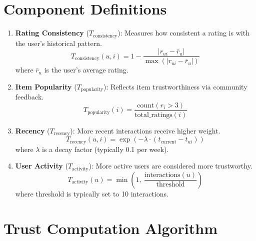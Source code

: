 \documentclass[12pt,a4paper]{report}
\begin{document}
{\section{Component Definitions}

\begin{enumerate}
    \item \textbf{Rating Consistency} ($T_{\text{consistency}}$): Measures how consistent a rating is with the user's historical pattern.
    \begin{equation}
    T_{\text{consistency}}(u,i) = 1 - \frac{|r_{ui} - \bar{r}_u|}{\max(|r_{ui} - \bar{r}_u|)}
    \end{equation}
    where $\bar{r}_u$ is the user's average rating.

    \item \textbf{Item Popularity} ($T_{\text{popularity}}$): Reflects item trustworthiness via community feedback.
    \begin{equation}
    T_{\text{popularity}}(i) = \frac{\text{count}(r_i > 3)}{\text{total\_ratings}(i)}
    \end{equation}

    \item \textbf{Recency} ($T_{\text{recency}}$): More recent interactions receive higher weight.
    \begin{equation}
    T_{\text{recency}}(u,i) = \exp\!\left(-\lambda \cdot (t_{\text{current}} - t_{ui})\right)
    \end{equation}
    where $\lambda$ is a decay factor (typically 0.1 per week).

    \item \textbf{User Activity} ($T_{\text{activity}}$): More active users are considered more trustworthy.
    \begin{equation}
    T_{\text{activity}}(u) = \min\!\left(1,\ \frac{\text{interactions}(u)}{\text{threshold}}\right)
    \end{equation}
    where threshold is typically set to 10 interactions.
\end{enumerate}

\section{Trust Computation Algorithm}

}
\end{document}
